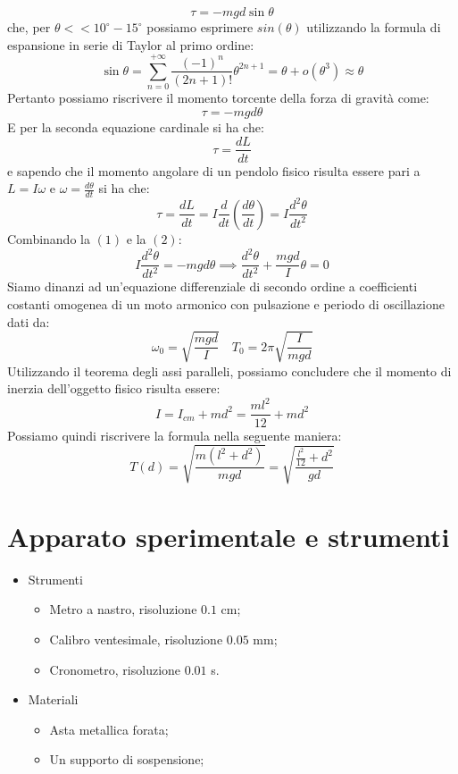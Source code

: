 \documentclass{article}
\begin{document}
\begin{equation}
	\tau = -mgd\sin{\theta}
\end{equation}
che, per $\theta << 10^\circ - 15^\circ$ possiamo esprimere $sin(\theta)$ utilizzando la formula di espansione in serie di Taylor al primo ordine:
\begin{equation*}
	\sin{\theta} = \sum_{n = 0}^{+\infty} \frac{(-1)^n}{(2n+1)!}\theta^{2n+1} = \theta + o(\theta^3) \approx \theta
\end{equation*}
Pertanto possiamo riscrivere il momento torcente della forza di gravità come:
\begin{equation*}
	\tau = -mgd\theta
\end{equation*}
E per la seconda equazione cardinale si ha che:
\begin{equation}
	\tau = \frac{dL}{dt}
\end{equation}
e sapendo che il momento angolare di un pendolo fisico risulta essere pari a $L = I\omega$ e $\omega = \frac{d\theta}{dt}$ si ha che:
$$
	\tau = \frac{dL}{dt} = I\frac{d}{dt} \left(\frac{d\theta}{dt} \right) = I\frac{d^2 \theta}{dt^2}
$$
Combinando la $(1)$ e la $(2)$:
\begin{equation}
	I\frac{d^2 \theta}{dt^2} = -mgd\theta \implies \frac{d^2 \theta}{dt^2} + \frac{mgd}{I}\theta = 0 
\end{equation}
Siamo dinanzi ad un'equazione differenziale di secondo ordine a coefficienti costanti omogenea di un moto armonico con pulsazione e periodo di oscillazione dati da:
$$\omega_0 = \sqrt{\frac{mgd}{I}} \, \, \, \, \, \, T_0 = 2\pi\sqrt{\frac{I}{mgd}}$$
Utilizzando il teorema degli assi paralleli, possiamo concludere che il momento di inerzia dell'oggetto fisico risulta essere:
$$
	I = I_{cm} + md^2 = \frac{ml^2}{12} + md^2
$$
Possiamo quindi riscrivere la formula nella seguente maniera:
\begin{equation}
	T(d) = \sqrt{\frac{m(l^2 + d^2)}{mgd}} = \sqrt{\frac{\frac{l^2}{12} + d^2}{gd}}
\end{equation}
\section{Apparato sperimentale e strumenti}

\begin{itemize}
	\item Strumenti 
	\begin{itemize}
		\item Metro a nastro, risoluzione $0.1$ cm;
		\item Calibro ventesimale, risoluzione $0.05$ mm;
		\item Cronometro, risoluzione $0.01 $ s.
	\end{itemize}
	\item Materiali
	\begin{itemize}
		\item Asta metallica forata;
		\item Un supporto di sospensione;
	\end{itemize}
\end{itemize}
\end{document}

